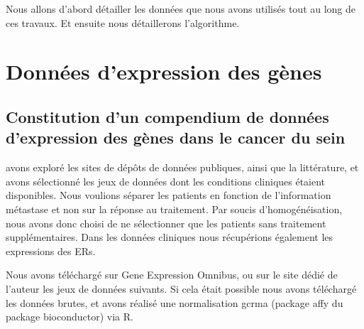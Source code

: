      Nous allons d'abord détailler les données que nous avons utilisés tout au long de ces travaux.
      Et ensuite nous détaillerons l'algorithme.
  \section{\textcolor{mygreen}{Données d'expression des gènes}}\label{sec:GEP}

    \subsection{\textcolor{mygreen}{Constitution d'un compendium de données d'expression des gènes dans le cancer du sein}}
       avons exploré les sites de dépôts de données publiques, ainsi que la littérature, et avons sélectionné les jeux de données dont les conditions cliniques étaient disponibles. Nous voulions séparer les patients en fonction de l'information métastase et non sur la réponse au traitement. Par soucis d'homogénéisation, nous avons donc choisi de ne sélectionner que les patients sans traitement supplémentaires. Dans les données cliniques nous récupérions également les expressions des \aclp{ER}.

      Nous avons téléchargé sur Gene Expression Omnibus, ou sur le site dédié de l'auteur les jeux de données suivants. Si cela était possible nous avons téléchargé les données brutes, et avons réalisé une normalisation gcrma (package affy du package bioconductor) via R.

